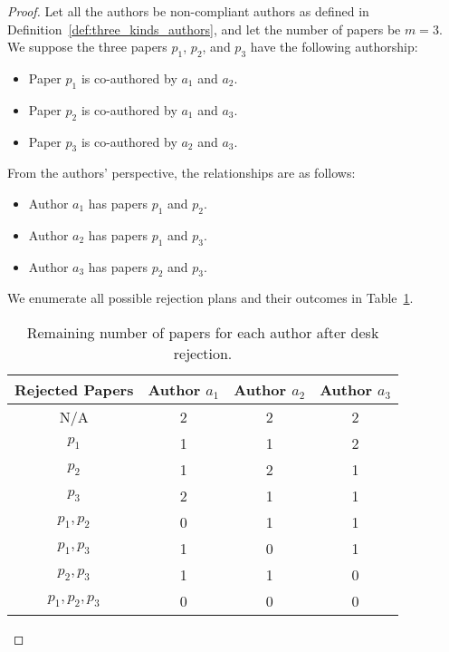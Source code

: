 \begin{proof}
Let all the authors be non-compliant authors as defined in Definition~\ref{def:three_kinds_authors}, and let the number of papers be $m=3$. We suppose the three papers $p_1$, $p_2$, and $p_3$ have the following authorship:

\begin{itemize}
    \item Paper $p_1$ is co-authored by $a_1$ and $a_2$.
    \item Paper $p_2$ is co-authored by $a_1$ and $a_3$.
    \item Paper $p_3$ is co-authored by $a_2$ and $a_3$.
\end{itemize}

From the authors' perspective, the relationships are as follows:
\begin{itemize}
    \item Author $a_1$ has papers $p_1$ and $p_2$.
    \item Author $a_2$ has papers $p_1$ and $p_3$.
    \item Author $a_3$ has papers $p_2$ and $p_3$.
\end{itemize}

We enumerate all possible rejection plans and their outcomes in Table~\ref{tab:all_possible_rejections}.

\begin{table}[!ht]
\caption{Remaining number of papers for each author after desk rejection.}
\label{tab:all_possible_rejections}
\begin{center}
\begin{tabular}{|c|c|c|c|}
 \hline
 Rejected Papers & Author $a_1$ & Author $a_2$ & Author $a_3$ \\ \hline
 N/A             & 2            & 2            & 2            \\ \hline
 $p_1$           & 1            & 1            & 2            \\ \hline
 $p_2$           & 1            & 2            & 1            \\ \hline
 $p_3$           & 2            & 1            & 1            \\ \hline
 $p_1, p_2$      & 0            & 1            & 1            \\ \hline
 $p_1, p_3$      & 1            & 0            & 1            \\ \hline
 $p_2, p_3$      & 1            & 1            & 0            \\ \hline
 $p_1, p_2, p_3$ & 0            & 0            & 0            \\ \hline
\end{tabular}
\end{center}
\end{table}


\end{proof}
